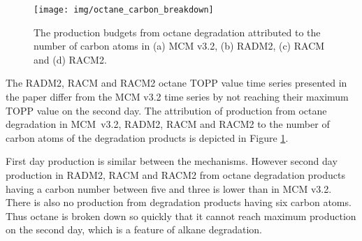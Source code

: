 
\begin{figure}
    \begin{center}
        \texttt{[image: img/octane\_carbon\_breakdown]}
        \caption{The  production budgets from octane degradation attributed to the number of carbon atoms in (a) MCM v3.2, (b) RADM2, (c) RACM and (d) RACM2.}
        \label{f:octane_carbons}
    \end{center}
\end{figure} 

The RADM2, RACM and RACM2 octane TOPP value time series presented in the paper differ from the MCM v3.2 time series by not reaching their maximum TOPP value on the second day.  
The attribution of  production from octane degradation in \mbox{MCM v3.2}, RADM2, RACM and RACM2 to the number of carbon atoms of the degradation products is depicted in Figure \ref{f:octane_carbons}. 

First day  production is similar between the mechanisms. 
However second day  production in RADM2, RACM and RACM2 from octane degradation products having a carbon number between five and three is lower than in MCM v3.2. 
There is also no  production from degradation products having six carbon atoms. 
Thus octane is broken down so quickly that it cannot reach maximum  production on the second day, which is a feature of alkane degradation.
